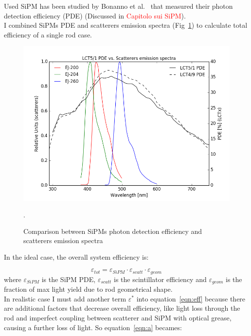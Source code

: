\documentclass[10pt,a4paper, openany]{book}
\begin{document}
Used SiPM has been studied by Bonanno et al.~\cite{sipm:1} that measured their photon detection efficiency (PDE) (Discussed in \textcolor{red}{Capitolo sui SiPM}).\\
I combined SiPMs PDE and scatterers emission spectra (Fig~\ref{fig:sipm}) to calculate total efficiency of a single rod case.

\begin{figure}[!h]
\begin{center}
\includegraphics[scale=0.55]{imm/lct_ej_conf.png}
\end{center}
\caption{Comparison between SiPMs photon detection efficiency and scatterers emission spectra}. 
\label{fig:sipm}
\end{figure}

In the ideal case, the overall system efficiency is:

\begin{equation}
\label{eqn:eff}
\varepsilon_{tot} = \varepsilon_{SiPM} \cdot \varepsilon_{scatt} \cdot \varepsilon_{geom} 
\end{equation}
where $\varepsilon_{SiPM}$ is the SiPM PDE, $\varepsilon_{scatt}$ is the scintillator efficiency and $\varepsilon_{geom}$ is the fraction of max light yield due to rod geometrical shape.\\
In realistic case I must add another term $\varepsilon^*$ into equation~\ref{eqn:eff} because there are additional factors that decrease overall efficiency, like light loss through the rod and imperfect coupling between scatterer and SiPM with optical grease, causing a further loss of light.
So equation~\ref{eqn:a} becames:
\end{document}
